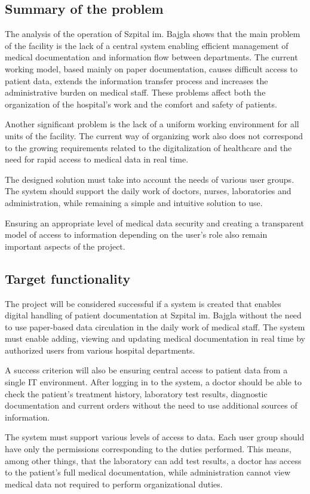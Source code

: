 \subsection{Summary of the problem}
The analysis of the operation of Szpital im. Bajgla shows that the main problem of the facility is the lack of a central system enabling efficient management of medical documentation and information flow between departments. The current working model, based mainly on paper documentation, causes difficult access to patient data, extends the information transfer process and increases the administrative burden on medical staff. These problems affect both the organization of the hospital's work and the comfort and safety of patients.

Another significant problem is the lack of a uniform working environment for all units of the facility. The current way of organizing work also does not correspond to the growing requirements related to the digitalization of healthcare and the need for rapid access to medical data in real time.

The designed solution must take into account the needs of various user groups. The system should support the daily work of doctors, nurses, laboratories and administration, while remaining a simple and intuitive solution to use.

Ensuring an appropriate level of medical data security and creating a transparent model of access to information depending on the user's role also remain important aspects of the project.

\subsection{Target functionality}
The project will be considered successful if a system is created that enables digital handling of patient documentation at Szpital im. Bajgla without the need to use paper-based data circulation in the daily work of medical staff. The system must enable adding, viewing and updating medical documentation in real time by authorized users from various hospital departments.

A success criterion will also be ensuring central access to patient data from a single IT environment. After logging in to the system, a doctor should be able to check the patient's treatment history, laboratory test results, diagnostic documentation and current orders without the need to use additional sources of information.

The system must support various levels of access to data. Each user group should have only the permissions corresponding to the duties performed. This means, among other things, that the laboratory can add test results, a doctor has access to the patient's full medical documentation, while administration cannot view medical data not required to perform organizational duties.


